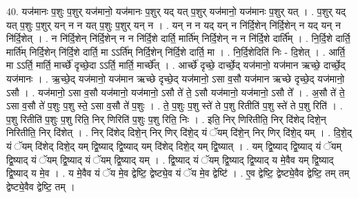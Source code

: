\documentclass[17pt]{extarticle}
\begin{document}
40. यज॑मानः प॒शुः प॒शुर् यज॑मानो॒ यज॑मानः प॒शुर् यद् यत् प॒शुर् यज॑मानो॒ यज॑मानः प॒शुर् यत् । . प॒शुर् यद् यत् प॒शुः प॒शुर् यन् न न यत् प॒शुः प॒शुर् यन् न । . यन् न न यद् यन् न नि॑र्दि॒शेन् नि॑र्दि॒शेन् न यद् यन् न नि॑र्दि॒शेत् । . न नि॑र्दि॒शेन् नि॑र्दि॒शेन् न न नि॑र्दि॒शे दार्ति॒ मार्ति॑म् निर्दि॒शेन् न न नि॑र्दि॒शे दार्ति᳚म् । . नि॒र्दि॒शे दार्ति॒ मार्ति॑म् निर्दि॒शेन् नि॑र्दि॒शे दार्ति॒ मा ऽऽर्ति॑म् निर्दि॒शेन् नि॑र्दि॒शे दार्ति॒ मा । . नि॒र्दि॒शेदिति॑ निः - दि॒शेत् । . आर्ति॒ मा ऽऽर्ति॒ मार्ति॒ मार्च्छे॑ दृच्छे॒दा ऽऽर्ति॒ मार्ति॒ मार्च्छे᳚त् । . आर्च्छे॑ दृच्छे॒ दार्च्छे॒द् यज॑मानो॒ यज॑मान ऋच्छे॒ दार्च्छे॒द् यज॑मानः । . ऋ॒च्छे॒द् यज॑मानो॒ यज॑मान ऋच्छे दृच्छे॒द् यज॑मानो॒ ऽसा व॒सौ यज॑मान ऋच्छे दृच्छे॒द् यज॑मानो॒ ऽसौ । . यज॑मानो॒ ऽसा व॒सौ यज॑मानो॒ यज॑मानो॒ ऽसौ ते॑ ते॒ ऽसौ यज॑मानो॒ यज॑मानो॒ ऽसौ ते᳚ । . अ॒सौ ते॑ ते॒ ऽसा व॒सौ ते॑ प॒शुः प॒शु स्ते॒ ऽसा व॒सौ ते॑ प॒शुः । . ते॒ प॒शुः प॒शु स्ते॑ ते प॒शु रितीति॑ प॒शु स्ते॑ ते प॒शु रिति॑ । . प॒शु रितीति॑ प॒शुः प॒शु रिति॒ निर् णिरिति॑ प॒शुः प॒शु रिति॒ निः । . इति॒ निर् णिरितीति॒ निर् दि॑शेद् दिशे॒न् निरितीति॒ निर् दि॑शेत् । . निर् दि॑शेद् दिशे॒न् निर् णिर् दि॑शे॒द् यं ॅयम् दि॑शे॒न् निर् णिर् दि॑शे॒द् यम् । . दि॒शे॒द् यं ॅयम् दि॑शेद् दिशे॒द् यम् द्वि॒ष्याद् द्वि॒ष्याद् यम् दि॑शेद् दिशे॒द् यम् द्वि॒ष्यात् । . यम् द्वि॒ष्याद् द्वि॒ष्याद् यं ॅयम् द्वि॒ष्याद् यं ॅयम् द्वि॒ष्याद् यं ॅयम् द्वि॒ष्याद् यम् । . द्वि॒ष्याद् यं ॅयम् द्वि॒ष्याद् द्वि॒ष्याद् य मे॒वैव यम् द्वि॒ष्याद् द्वि॒ष्याद् य मे॒व । . य मे॒वैव यं ॅय मे॒व द्वेष्टि॒ द्वेष्ट्ये॒व यं ॅय मे॒व द्वेष्टि॑ । . ए॒व द्वेष्टि॒ द्वेष्ट्ये॒वैव द्वेष्टि॒ तम् तम् द्वेष्ट्ये॒वैव द्वेष्टि॒ तम् । \newline
\pagebreak
{}
\end{document}
